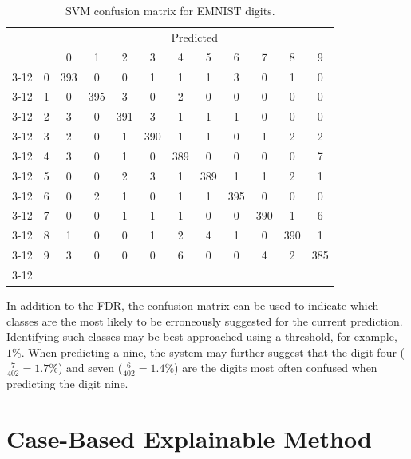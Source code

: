 \begin{table}[H]
    \centering
    \caption{SVM confusion matrix for EMNIST digits.}
    \label{tab:emnist_digit_svm}
    \renewcommand{\arraystretch}{1.3}
    \begin{tabular}{ll|c|c|c|c|c|c|c|c|c|c|}
        \multicolumn{2}{c}{}& \multicolumn{10}{c}{Predicted}\\
        & \multicolumn{1}{c}{} & \multicolumn{1}{c}{0} & \multicolumn{1}{c}{1} & \multicolumn{1}{c}{2}
        & \multicolumn{1}{c}{3} & \multicolumn{1}{c}{4} & \multicolumn{1}{c}{5} & \multicolumn{1}{c}{6}
        & \multicolumn{1}{c}{7} & \multicolumn{1}{c}{8} & \multicolumn{1}{c}{9} \\
        \cline{3-12}
        \multirow{10}{*}{{\rotatebox[origin=c]{90}{Actual}
        }} & 
        0 &     393 & 0 & 0 & 1 & 1 & 1 & 3 & 0 & 1 & 0 \\ \cline{3-12}
        &   1 & 0 & 395 & 3 & 0 & 2 & 0 & 0 & 0 & 0 & 0 \\ \cline{3-12}
        &   2 & 3 & 0 & 391 & 3 & 1 & 1 & 1 & 0 & 0 & 0 \\ \cline{3-12}
        &   3 & 2 & 0 & 1 & 390 & 1 & 1 & 0 & 1 & 2 & 2 \\ \cline{3-12}
        &   4 & 3 & 0 & 1 & 0 & 389 & 0 & 0 & 0 & 0 & 7  \\ \cline{3-12}
        &   5 & 0 & 0 & 2 & 3 & 1 & 389 & 1 & 1 & 2 & 1 \\ \cline{3-12}
        &   6 & 0 & 2 & 1 & 0 & 1 & 1 & 395 & 0 & 0 & 0 \\ \cline{3-12}
        &   7 & 0 & 0 & 1 & 1 & 1 & 0 & 0 & 390 & 1 & 6 \\ \cline{3-12}
        &   8 & 1 & 0 & 0 & 1 & 2 & 4 & 1 & 0 & 390 & 1 \\ \cline{3-12}
        &   9 & 3 & 0 & 0 & 0 & 6 & 0 & 0 & 4 & 2 & 385 \\ \cline{3-12}
    \end{tabular}
\end{table}

In addition to the FDR, the confusion matrix can be used to indicate which
classes are the most likely to be erroneously suggested for the current
prediction. Identifying such classes may be best approached using a threshold,
for example, $1\%$. When predicting a nine, the system may further suggest that
the digit four ($\frac{7}{402}=1.7\%$) and seven ($\frac{6}{402}=1.4\%$) are the
digits most often confused when predicting the digit nine.

\section{Case-Based Explainable Method}

